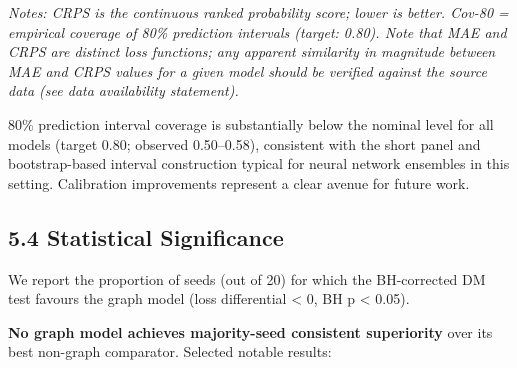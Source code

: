 \documentclass[
  11pt,
  a4paper]{article}
\begin{document}
\emph{Notes: CRPS is the continuous ranked probability score; lower is
better. Cov-80 = empirical coverage of 80\% prediction intervals
(target: 0.80). Note that MAE and CRPS are distinct loss functions; any
apparent similarity in magnitude between MAE and CRPS values for a given
model should be verified against the source data (see data availability
statement).}

80\% prediction interval coverage is substantially below the nominal
level for all models (target 0.80; observed 0.50--0.58), consistent with
the short panel and bootstrap-based interval construction typical for
neural network ensembles in this setting. Calibration improvements
represent a clear avenue for future work.

\subsection{5.4 Statistical
Significance}\label{statistical-significance}

We report the proportion of seeds (out of 20) for which the BH-corrected
DM test favours the graph model (loss differential \textless{} 0, BH p
\textless{} 0.05).

\textbf{No graph model achieves majority-seed consistent superiority}
over its best non-graph comparator. Selected notable results:
\end{document}
